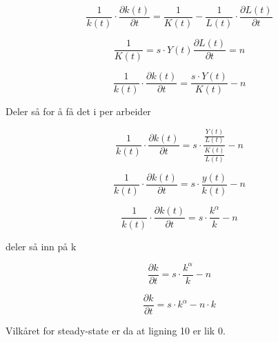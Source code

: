 \documentclass[
  12pt,
  a4paper,
  DIV=11,
  numbers=noendperiod]{scrartcl}
\begin{document}
\[\frac{1}{k(t)} \cdot \frac {\partial k(t)}{\partial t} = \frac{1}{K(t)}- \frac{1}{L(t)} \cdot \frac{\partial L(t)}{\partial t}\]

\[\frac{1}{K(t)} = s \cdot Y(t) \frac{\partial L(t)}{\partial t} = n\]

\[\frac{1}{k(t)} \cdot \frac {\partial k(t)}{\partial t} = \frac{s \cdot Y(t)}{K(t)}- n\]

Deler så for å få det i per arbeider

\[\frac{1}{k(t)} \cdot \frac {\partial k(t)}{\partial t} = s \cdot \frac{\frac{Y(t)}{L(t)}}{\frac{K(t)}{L(t)}} -n\]

\[\frac{1}{k(t)} \cdot \frac {\partial k(t)}{\partial t} = s \cdot \frac{y(t)}{k(t)} - n\]

\[\frac{1}{k(t)} \cdot \frac {\partial k(t)}{\partial t} = s \cdot \frac{k^\alpha}{k} - n\]

deler så inn på k

\[\frac{\partial k}{\partial t} = s \cdot \frac{k^\alpha}{k}-n\]

\[\frac{\partial k}{ \partial t} = s \cdot k^\alpha - n \cdot k \tag{10}\]

Vilkåret for steady-state er da at ligning 10 er lik 0.

\end{document}
